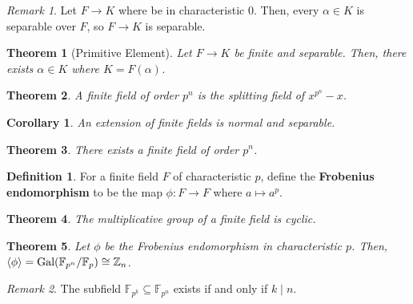 \documentclass[
    parskip=half,
    toc=flat,
    toc=sectionentrydotfill,
]{scrartcl}  %
\theoremstyle{definition}
\newtheorem{definition}{Definition}[section]
\theoremstyle{plain}
\newtheorem{theorem}{Theorem}[section]
\newtheorem{corollary}{Corollary}[theorem]
\theoremstyle{remark}
\newtheorem{remark}{Remark}[section]
\newcommand{\F}{\mathbb{F}}
\begin{document}
\begin{remark}
    Let $F\to K$ where be in characteristic $0$.
    Then, every $\alpha\in K$ is separable over $F$, so $F\to K$ is separable.
\end{remark}

\begin{theorem}[Primitive Element]
    Let $F\to K$ be finite and separable.
    Then, there exists $\alpha\in K$ where $K=F(\alpha)$.
\end{theorem}

\begin{theorem}
    A finite field of order $p^n$ is the splitting field of $x^{p^n}-x$.
\end{theorem}

\begin{corollary}
    An extension of finite fields is normal and separable.
\end{corollary}

\begin{theorem}
    There exists a finite field of order $p^n$.
\end{theorem}

\begin{definition}
    For a finite field $F$ of characteristic $p$, define the \textbf{Frobenius endomorphism} to be
    the map $\phi:F\to F$ where $a\mapsto a^p$.
\end{definition}

\begin{theorem}
    The multiplicative group of a finite field is cyclic.
\end{theorem}

\begin{theorem}
    Let $\phi$ be the Frobenius endomorphism in characteristic $p$.
    Then, $\langle\phi\rangle=\textup{Gal}(\F_{p^n}/\F_p)\cong\mathbb{Z}_n$.
\end{theorem}

\begin{remark}
    The subfield $\F_{p^k}\subseteq\F_{p^n}$ exists if and only if $k\mid n$.
\end{remark}
\end{document}
